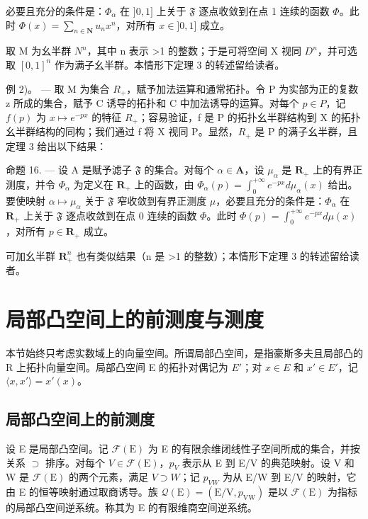 必要且充分的条件是：\(\Phi_{\alpha}\) 在 \(]0,1]\) 上关于 \(\mathfrak{F}\) 逐点收敛到在点 1 连续的函数 \(\Phi\)。此时 \(\Phi(x) = \sum_{n \in \mathbf{N}} u_n x^n\)，对所有 \(x \in ]0,1]\) 成立。

取 M 为幺半群 \(N^{n}\)，其中 n 表示 \textgreater1 的整数；于是可将空间 X 视同 \(D^{n}\)，并可选取 \([0,1]^{n}\) 作为满子幺半群。本情形下定理 3 的转述留给读者。

例 2)。 --- 取 M 为集合 \(R_{+}\)，赋予加法运算和通常拓扑。令 P 为实部为正的复数 z 所成的集合，赋予 C 诱导的拓扑和 C 中加法诱导的运算。对每个 \(p \in P\)，记 \(f(p)\) 为 \(x \mapsto e^{-px}\) 的特征 \(R_{+}\)；容易验证，f 是 P 的拓扑幺半群结构到 X 的拓扑幺半群结构的同构；我们通过 f 将 X 视同 P。显然，\(R_{+}\) 是 P 的满子幺半群，且定理 3 给出以下结果：

命题 16. --- 设 A 是赋予滤子 \(\mathfrak{F}\) 的集合。对每个 \(\alpha \in \mathbf{A}\)，设 \(\mu_{\alpha}\) 是 \(\mathbf{R}_{+}\) 上的有界正测度，并令 \(\Phi_{\alpha}\) 为定义在 \(\mathbf{R}_{+}\) 上的函数，由 \(\Phi_{\alpha}(p) = \int_{0}^{+\infty} e^{-px} d\mu_{\alpha}(x)\) 给出。要使映射 \(\alpha \mapsto \mu_{\alpha}\) 关于 \(\mathfrak{F}\) 窄收敛到有界正测度 \(\mu\)，必要且充分的条件是：\(\Phi_{\alpha}\) 在 \(\mathbf{R}_{+}\) 上关于 \(\mathfrak{F}\) 逐点收敛到在点 0 连续的函数 \(\Phi\)。此时 \(\Phi(p) = \int_{0}^{+\infty} e^{-px} d\mu(x)\)，对所有 \(p \in \mathbf{R}_{+}\) 成立。

可加幺半群 \(\mathbf{R}_{+}^{n}\) 也有类似结果（n 是 \textgreater1 的整数）；本情形下定理 3 的转述留给读者。

\section{局部凸空间上的前测度与测度}

本节始终只考虑实数域上的向量空间。所谓局部凸空间，是指豪斯多夫且局部凸的 R 上拓扑向量空间。局部凸空间 E 的拓扑对偶记为 \(E'\)；对 \(x \in E\) 和 \(x' \in E'\)，记 \(\langle x, x' \rangle = x'(x)\)。

\subsection{局部凸空间上的前测度}

设 E 是局部凸空间。记 \(\mathcal{F}(\mathrm{E})\) 为 E 的有限余维闭线性子空间所成的集合，并按关系 \(\supset\) 排序。对每个 \(V \in \mathcal{F}(\mathrm{E})\)，\(p_{V}\) 表示从 E 到 E/V 的典范映射。设 V 和 W 是 \(\mathcal{F}(\mathrm{E})\) 的两个元素，满足 \(V \supset W\)；记 \(p_{VW}\) 为从 E/W 到 E/V 的映射，它由 E 的恒等映射通过取商诱导。族 \(\mathcal{Q}(\mathrm{E}) = (\mathrm{E}/\mathrm{V}, p_{\mathrm{VW}})\) 是以 \(\mathcal{F}(\mathrm{E})\) 为指标的局部凸空间逆系统。称其为 E 的有限维商空间逆系统。

